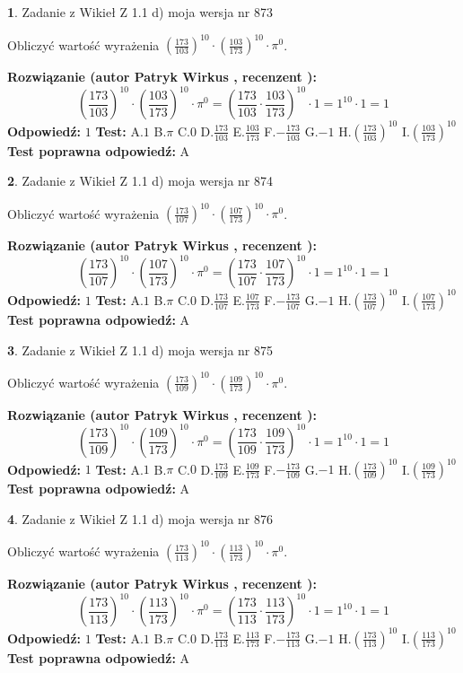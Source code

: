 \documentclass[12pt, a4paper]{article}
\theoremstyle{definition} %
\newtheorem{zad}{}
\newcommand{\zadStart}[1]{\begin{zad}#1\newline}
\newcommand{\zadStop}{\end{zad}}
\newcommand{\rozwStart}[2]{\noindent \textbf{Rozwiązanie (autor #1 , recenzent #2): }\newline}
\newcommand{\rozwStop}{\newline}
\newcommand{\odpStart}{\noindent \textbf{Odpowiedź:}\newline}
\newcommand{\odpStop}{\newline}
\newcommand{\testStart}{\noindent \textbf{Test:}\newline}
\newcommand{\testStop}{\newline}
\newcommand{\kluczStart}{\noindent \textbf{Test poprawna odpowiedź:}\newline}
\newcommand{\kluczStop}{\newline}
\begin{document}
\zadStart{Zadanie z Wikieł Z 1.1 d) moja wersja nr 873}

Obliczyć wartość wyrażenia $(\frac{173}{103})^{10} \cdot (\frac{103}{173})^{10} \cdot \pi^{0}$.
\zadStop
\rozwStart{Patryk Wirkus}{}
$$(\frac{173}{103})^{10} \cdot (\frac{103}{173})^{10} \cdot \pi^{0} = (\frac{173}{103} \cdot \frac{103}{173})^{10} \cdot 1 = 1^{10} \cdot 1 = 1$$
\rozwStop
\odpStart
$1$
\odpStop
\testStart
A.$1$ B.$\pi$ C.$0$ D.$\frac{173}{103}$ E.$\frac{103}{173}$
F.$-\frac{173}{103}$ G.$-1$
H.$(\frac{173}{103})^{10}$
I.$(\frac{103}{173})^{10}$
\testStop
\kluczStart
A
\kluczStop



\zadStart{Zadanie z Wikieł Z 1.1 d) moja wersja nr 874}

Obliczyć wartość wyrażenia $(\frac{173}{107})^{10} \cdot (\frac{107}{173})^{10} \cdot \pi^{0}$.
\zadStop
\rozwStart{Patryk Wirkus}{}
$$(\frac{173}{107})^{10} \cdot (\frac{107}{173})^{10} \cdot \pi^{0} = (\frac{173}{107} \cdot \frac{107}{173})^{10} \cdot 1 = 1^{10} \cdot 1 = 1$$
\rozwStop
\odpStart
$1$
\odpStop
\testStart
A.$1$ B.$\pi$ C.$0$ D.$\frac{173}{107}$ E.$\frac{107}{173}$
F.$-\frac{173}{107}$ G.$-1$
H.$(\frac{173}{107})^{10}$
I.$(\frac{107}{173})^{10}$
\testStop
\kluczStart
A
\kluczStop



\zadStart{Zadanie z Wikieł Z 1.1 d) moja wersja nr 875}

Obliczyć wartość wyrażenia $(\frac{173}{109})^{10} \cdot (\frac{109}{173})^{10} \cdot \pi^{0}$.
\zadStop
\rozwStart{Patryk Wirkus}{}
$$(\frac{173}{109})^{10} \cdot (\frac{109}{173})^{10} \cdot \pi^{0} = (\frac{173}{109} \cdot \frac{109}{173})^{10} \cdot 1 = 1^{10} \cdot 1 = 1$$
\rozwStop
\odpStart
$1$
\odpStop
\testStart
A.$1$ B.$\pi$ C.$0$ D.$\frac{173}{109}$ E.$\frac{109}{173}$
F.$-\frac{173}{109}$ G.$-1$
H.$(\frac{173}{109})^{10}$
I.$(\frac{109}{173})^{10}$
\testStop
\kluczStart
A
\kluczStop



\zadStart{Zadanie z Wikieł Z 1.1 d) moja wersja nr 876}

Obliczyć wartość wyrażenia $(\frac{173}{113})^{10} \cdot (\frac{113}{173})^{10} \cdot \pi^{0}$.
\zadStop
\rozwStart{Patryk Wirkus}{}
$$(\frac{173}{113})^{10} \cdot (\frac{113}{173})^{10} \cdot \pi^{0} = (\frac{173}{113} \cdot \frac{113}{173})^{10} \cdot 1 = 1^{10} \cdot 1 = 1$$
\rozwStop
\odpStart
$1$
\odpStop
\testStart
A.$1$ B.$\pi$ C.$0$ D.$\frac{173}{113}$ E.$\frac{113}{173}$
F.$-\frac{173}{113}$ G.$-1$
H.$(\frac{173}{113})^{10}$
I.$(\frac{113}{173})^{10}$
\testStop
\kluczStart
A
\kluczStop
\end{document}
